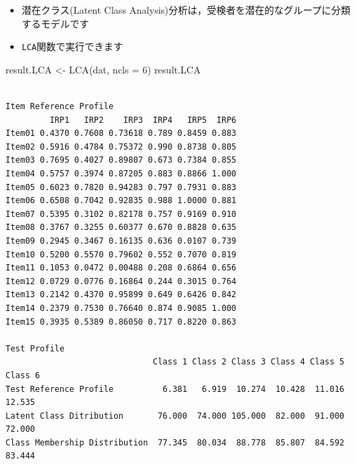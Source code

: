 \documentclass[
  a4paper,
]{ltjsbook}
\newenvironment{Shaded}{\begin{snugshade}}{\end{snugshade}}
\newcommand{\AttributeTok}[1]{\textcolor[rgb]{0.40,0.45,0.13}{#1}}
\newcommand{\DecValTok}[1]{\textcolor[rgb]{0.68,0.00,0.00}{#1}}
\newcommand{\FunctionTok}[1]{\textcolor[rgb]{0.28,0.35,0.67}{#1}}
\newcommand{\NormalTok}[1]{\textcolor[rgb]{0.00,0.23,0.31}{#1}}
\newcommand{\OtherTok}[1]{\textcolor[rgb]{0.00,0.23,0.31}{#1}}
\providecommand{\tightlist}{%
  \setlength{\itemsep}{0pt}\setlength{\parskip}{0pt}}\usepackage{longtable,booktabs,array}
\begin{document}
\begin{itemize}
\tightlist
\item
  潜在クラス(Latent Class
  Analysis)分析は，受検者を潜在的なグループに分類するモデルです
\item
  \texttt{LCA}関数で実行できます
\end{itemize}

\begin{Shaded}
\begin{Highlighting}[]
\NormalTok{result.LCA }\OtherTok{\textless{}{-}} \FunctionTok{LCA}\NormalTok{(dat, }\AttributeTok{ncls =} \DecValTok{6}\NormalTok{)}
\NormalTok{result.LCA}
\end{Highlighting}
\end{Shaded}

\begin{verbatim}

Item Reference Profile
         IRP1   IRP2    IRP3  IRP4   IRP5  IRP6
Item01 0.4370 0.7608 0.73618 0.789 0.8459 0.883
Item02 0.5916 0.4784 0.75372 0.990 0.8738 0.805
Item03 0.7695 0.4027 0.89807 0.673 0.7384 0.855
Item04 0.5757 0.3974 0.87205 0.883 0.8866 1.000
Item05 0.6023 0.7820 0.94283 0.797 0.7931 0.883
Item06 0.6508 0.7042 0.92835 0.988 1.0000 0.881
Item07 0.5395 0.3102 0.82178 0.757 0.9169 0.910
Item08 0.3767 0.3255 0.60377 0.670 0.8828 0.635
Item09 0.2945 0.3467 0.16135 0.636 0.0107 0.739
Item10 0.5200 0.5570 0.79602 0.552 0.7070 0.819
Item11 0.1053 0.0472 0.00488 0.208 0.6864 0.656
Item12 0.0729 0.0776 0.16864 0.244 0.3015 0.764
Item13 0.2142 0.4370 0.95899 0.649 0.6426 0.842
Item14 0.2379 0.7530 0.76640 0.874 0.9085 1.000
Item15 0.3935 0.5389 0.86050 0.717 0.8220 0.863

Test Profile
                              Class 1 Class 2 Class 3 Class 4 Class 5 Class 6
Test Reference Profile          6.381   6.919  10.274  10.428  11.016  12.535
Latent Class Ditribution       76.000  74.000 105.000  82.000  91.000  72.000
Class Membership Distribution  77.345  80.034  88.778  85.807  84.592  83.444


\end{verbatim}
\end{document}

